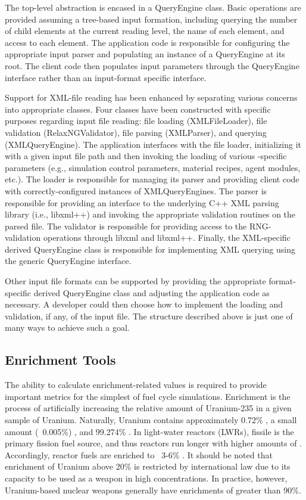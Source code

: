 The top-level abstraction is encased in a QueryEngine class. Basic operations
are provided assuming a tree-based input formation, including querying the
number of child elements at the current reading level, the name of each element,
and access to each element. The application code is responsible for configuring
the appropriate input parser and populating an instance of a QueryEngine at its
root. The client code then populates input parameters through the QueryEngine
interface rather than an input-format specific interface.

Support for XML-file reading has been enhanced by separating various concerns
into appropriate classes. Four classes have been constructed with specific
purposes regarding input file reading: file loading (XMLFileLoader), file
validation (RelaxNGValidator), file parsing (XMLParser), and querying
(XMLQueryEngine). The application interfaces with the file loader, initializing
it with a given input file path and then invoking the loading of various
\Cyclus-specific parameters (e.g., simulation control parameters, material
recipes, agent modules, etc.). The loader is responsible for managing its parser
and providing client code with correctly-configured instances of
XMLQueryEngines. The parser is responsible for providing an interface to the
underlying C++ XML parsing library (i.e., libxml++) and invoking the appropriate
validation routines on the parsed file. The validator is responsible for
providing access to the RNG-validation operations through libxml and
libxml++. Finally, the XML-specific derived QueryEngine class is responsible for
implementing XML querying using the generic QueryEngine interface.

Other input file formats can be supported by providing the appropriate
format-specific derived QueryEngine class and adjusting the application code as
necessary. A developer could then choose how to implement the loading and
validation, if any, of the input file. The structure described above is just one
of many ways to achieve such a goal.

\subsection{Enrichment Tools}\label{sec:prev-enrich}

The ability to calculate enrichment-related values is required to provide
important metrics for the simplest of fuel cycle simulations. Enrichment is the
process of artificially increasing the relative amount of Uranium-235 in a given
sample of Uranium. Naturally, Uranium contains approximately 0.72\%
, a small amount (~0.005\%) , and 99.274\%
. In light-water reactors (LWRs), fissile  is the
primary fission fuel source, and thus reactors run longer with higher amounts of
. Accordingly, reactor fuels are enriched to ~3-6\%
. It should be noted that enrichment of Uranium above 20\% is
restricted by international law due to its capacity to be used as a weapon in
high concentrations. In practice, however, Uranium-based nuclear weapons
generally have enrichments of greater than 90\%.

